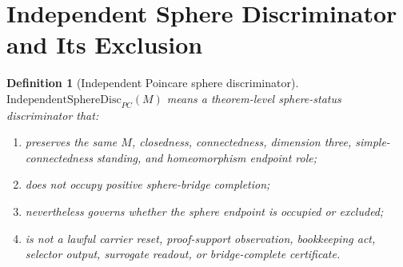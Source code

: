\documentclass[11pt]{article}
\newtheorem{definition}[theorem]{Definition}
\newcommand{\IndependentSphereDisc}{\mathrm{IndependentSphereDisc}_{PC}}
\begin{document}
\section{Independent Sphere Discriminator and Its Exclusion}\label{sec:independent-disc}

\begin{definition}[Independent Poincare sphere discriminator]
\(\IndependentSphereDisc(M)\) means a theorem-level sphere-status discriminator that:
\begin{enumerate}[label=(\alph*)]
\item preserves the same \(M\), closedness, connectedness, dimension three, simple-connectedness standing, and homeomorphism endpoint role;
\item does not occupy positive sphere-bridge completion;
\item nevertheless governs whether the sphere endpoint is occupied or excluded;
\item is not a lawful carrier reset, proof-support observation, bookkeeping act, selector output, surrogate readout, or bridge-complete certificate.
\end{enumerate}
\end{definition}
\end{document}
